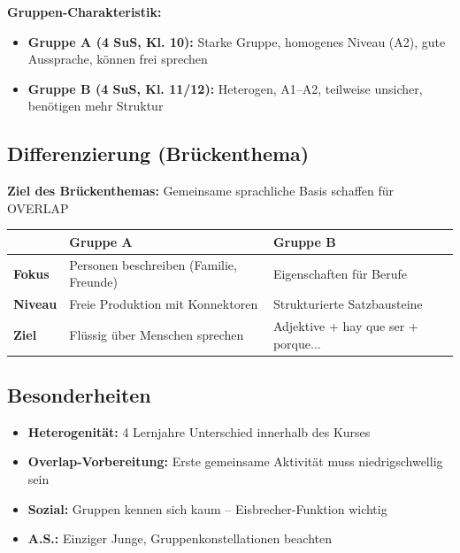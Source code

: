 \documentclass[11pt,a4paper]{article}
\begin{document}
\vspace{1em}

\textbf{Gruppen-Charakteristik:}
\begin{itemize}
    \item \textcolor{gruppeA}{\textbf{Gruppe A (4 SuS, Kl. 10):}} Starke Gruppe, homogenes Niveau (A2), gute Aussprache, können frei sprechen
    \item \textcolor{gruppeB}{\textbf{Gruppe B (4 SuS, Kl. 11/12):}} Heterogen, A1--A2, teilweise unsicher, benötigen mehr Struktur
\end{itemize}

\subsection{Differenzierung (Brückenthema)}

\textbf{Ziel des Brückenthemas:} Gemeinsame sprachliche Basis schaffen für OVERLAP

\begin{tabular}{|l|p{5cm}|p{5cm}|}
\hline
& \textcolor{gruppeA}{\textbf{Gruppe A}} & \textcolor{gruppeB}{\textbf{Gruppe B}} \\
\hline
\textbf{Fokus} & Personen beschreiben (Familie, Freunde) & Eigenschaften für Berufe \\
\hline
\textbf{Niveau} & Freie Produktion mit Konnektoren & Strukturierte Satzbausteine \\
\hline
\textbf{Ziel} & Flüssig über Menschen sprechen & Adjektive + hay que ser + porque... \\
\hline
\end{tabular}

\subsection{Besonderheiten}
\begin{itemize}
    \item \textbf{Heterogenität:} 4 Lernjahre Unterschied innerhalb des Kurses
    \item \textbf{Overlap-Vorbereitung:} Erste gemeinsame Aktivität muss niedrigschwellig sein
    \item \textbf{Sozial:} Gruppen kennen sich kaum -- Eisbrecher-Funktion wichtig
    \item \textbf{A.S.:} Einziger Junge, Gruppenkonstellationen beachten
\end{itemize}

\end{document}
